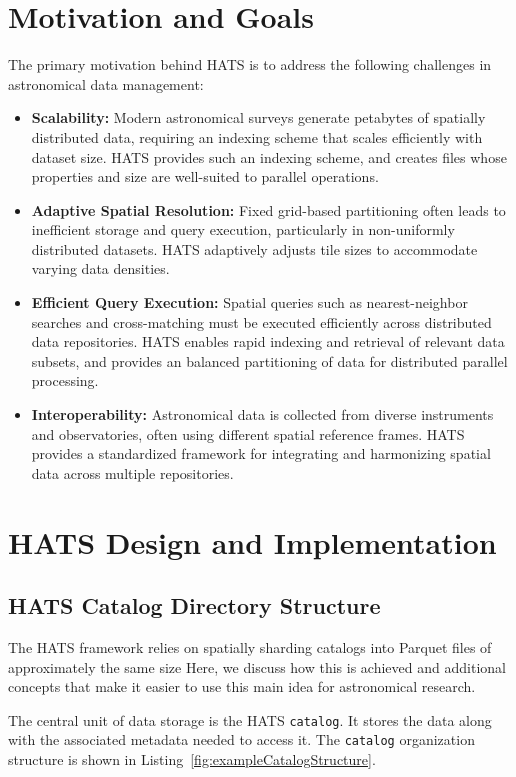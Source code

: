 \documentclass[11pt,a4paper]{ivoa}
\begin{document}
\section{Motivation and Goals}
The primary motivation behind HATS is to address the following challenges in astronomical data management:
\begin{itemize}
    \item \textbf{Scalability:} Modern astronomical surveys generate petabytes of spatially distributed data, requiring an indexing scheme that scales efficiently with dataset size.
    HATS provides such an indexing scheme, and creates files whose properties and size are well-suited to parallel operations.
    \item \textbf{Adaptive Spatial Resolution:} Fixed grid-based partitioning often leads to inefficient storage and query execution, particularly in non-uniformly distributed datasets. 
    HATS adaptively adjusts tile sizes to accommodate varying data densities.
    \item \textbf{Efficient Query Execution:} Spatial queries such as nearest-neighbor searches and cross-matching must be executed efficiently across distributed data repositories. 
    HATS enables rapid indexing and retrieval of relevant data subsets, and provides an balanced partitioning of data for distributed parallel processing.
    \item \textbf{Interoperability:} Astronomical data is collected from diverse instruments and observatories, often using different spatial reference frames. 
    HATS provides a standardized framework for integrating and harmonizing spatial data across multiple repositories.
\end{itemize}

\section{HATS Design and Implementation}

\subsection{HATS Catalog Directory Structure} \label{sec:catalog}

The HATS framework relies on spatially sharding catalogs into Parquet files of approximately the same size 
Here, we discuss how this is achieved and additional concepts that make it easier to use this main idea for astronomical research.

The central unit of data storage is the HATS \texttt{catalog}. 
It stores the data along with the associated metadata needed to access it. 
The  \texttt{catalog} organization structure is shown in Listing~\ref{fig:exampleCatalogStructure}.
\end{document}
